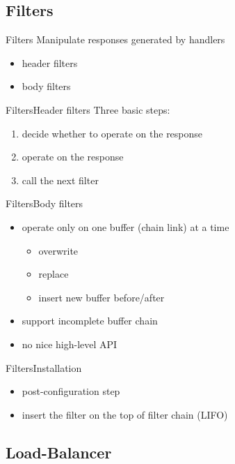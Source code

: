 \documentclass{beamer}
\begin{document}
\subsection{Filters}

\begin{frame}{Filters}
Manipulate responses generated by handlers
\begin{itemize}
 \item header filters
 \item body filters
\end{itemize}
\end{frame}

\begin{frame}{Filters}{Header filters}
Three basic steps:
\begin{enumerate}
\item decide whether to operate on the response
\item operate on the response
\item call the next filter
\end{enumerate}
\end{frame}

\begin{frame}{Filters}{Body filters}
\begin{itemize} 
 \item operate only on one buffer (chain link) at a time
 \begin{itemize}
  \item overwrite
  \item replace
  \item insert new buffer before/after
 \end{itemize}
 \item support incomplete buffer chain
 \item no nice high-level API
\end{itemize}
\end{frame}

\begin{frame}{Filters}{Installation}
\begin{itemize}
 \item post-configuration step
 \item insert the filter on the top of filter chain (LIFO)
\end{itemize}
\end{frame}

\subsection{Load-Balancer}
\end{document}
